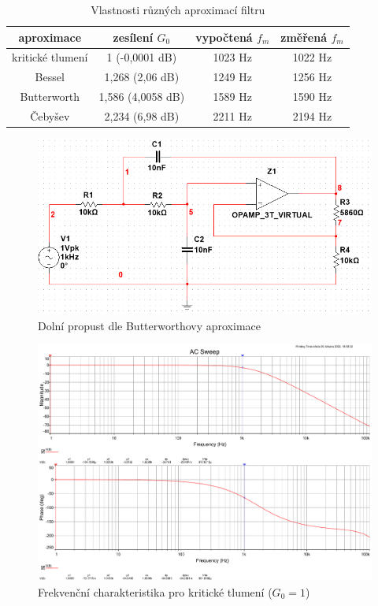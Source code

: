 \documentclass[twoside]{article}
\begin{document}
\begin{table}
    \centering
    \begin{tabular}{c|c|c|c}
        aproximace & zesílení $G_0$ & vypočtená $f_m$ & změřená $f_m$ \\ \hline
        kritické tlumení & 1 (-0,0001 dB) & 1023 \si{\hertz} & 1022 \si{\hertz} \\
        Bessel & 1,268 (2,06 dB) & 1249 \si{\hertz} & 1256 \si{\hertz} \\
        Butterworth & 1,586 (4,0058 dB)  & 1589 \si{\hertz} & 1590 \si{\hertz} \\
        Čebyšev & 2,234 (6,98 dB) & 2211 \si{\hertz}& 2194 \si{\hertz}
    \end{tabular}
    \label{tab:filtry}
    \caption{Vlastnosti různých aproximací filtru}
\end{table}

\begin{figure}[h!]
    \centering
    \includegraphics[width=0.55\linewidth]{bode_schema.png}
    \caption{Dolní propust dle Butterworthovy aproximace}
    \label{fig:schema_bode}
\end{figure}

\newpage
\begin{figure}[h!]
    \centering
    \includegraphics[width=0.92\linewidth]{bode_kriticke.pdf}
    \caption{Frekvenční charakteristika pro kritické tlumení ($G_0 = 1$)}
    \label{fig:bode_kriticke}
\end{figure}
\end{document}
